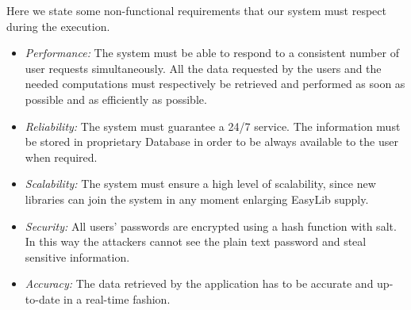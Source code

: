 \newpage
{}
Here we state some non-functional requirements that our system must respect during the execution.

\begin{itemize}
\item \emph{Performance:} The system must be able to respond to a consistent number of user requests simultaneously. All the data requested by the users and the needed computations must respectively be retrieved and performed as soon as possible and as efficiently as possible.

\item \emph{Reliability:} The system must guarantee a 24/7 service. The information must be stored in proprietary Database in order to be always available to the user when required.
\item \emph{Scalability:} The system must ensure a high level of scalability, since new libraries can join the system in any moment enlarging EasyLib supply.
\item \emph{Security:} All users’ passwords are encrypted using a hash function with salt. In this way the attackers cannot see the plain text password and steal sensitive information.

\item \emph{Accuracy:} The data retrieved by the application has to be accurate and up-to-date in a real-time fashion.
\end{itemize}